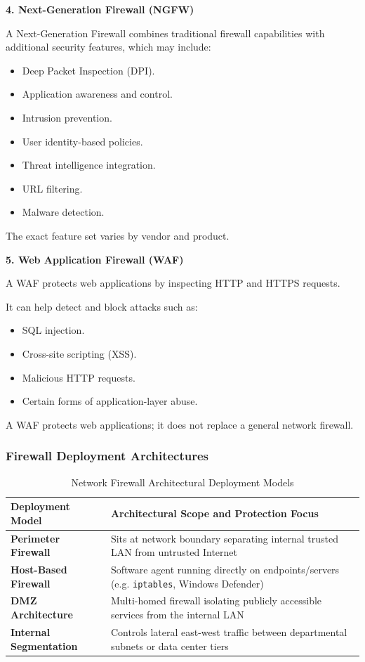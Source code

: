 \textbf{4. Next-Generation Firewall (NGFW)}

A Next-Generation Firewall combines traditional firewall capabilities with additional security features, which may include:

\begin{itemize}
\item Deep Packet Inspection (DPI).
\item Application awareness and control.
\item Intrusion prevention.
\item User identity-based policies.
\item Threat intelligence integration.
\item URL filtering.
\item Malware detection.
\end{itemize}

The exact feature set varies by vendor and product.

\textbf{5. Web Application Firewall (WAF)}

A WAF protects web applications by inspecting HTTP and HTTPS requests.

It can help detect and block attacks such as:

\begin{itemize}
\item SQL injection.
\item Cross-site scripting (XSS).
\item Malicious HTTP requests.
\item Certain forms of application-layer abuse.
\end{itemize}

A WAF protects web applications; it does not replace a general network firewall.

\subsubsection{Firewall Deployment Architectures}
\begin{table}[htbp]
\centering
\caption{Network Firewall Architectural Deployment Models}
\label{tab:firewall_architectures}
\begin{tabularx}{\textwidth}{p{3.8cm} X}
\toprule
\textbf{Deployment Model} & \textbf{Architectural Scope and Protection Focus} \\
\midrule
\textbf{Perimeter Firewall} & Sits at network boundary separating internal trusted LAN from untrusted Internet \\
\textbf{Host-Based Firewall} & Software agent running directly on endpoints/servers (e.g. \texttt{iptables}, Windows Defender) \\
\textbf{DMZ Architecture} & Multi-homed firewall isolating publicly accessible services from the internal LAN \\
\textbf{Internal Segmentation} & Controls lateral east-west traffic between departmental subnets or data center tiers \\
\bottomrule
\end{tabularx}
\end{table}

